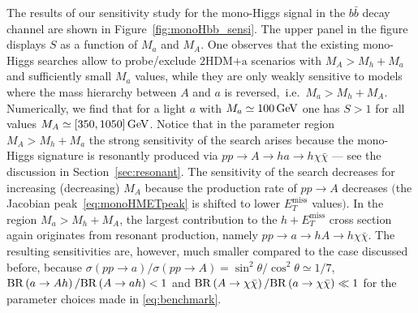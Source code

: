 \documentclass[a4paper, 11pt,notoc]{article}
\newcommand{\MET}{\ensuremath{E_T^\mathrm{miss}}\xspace}
\newcommand{\mA}{\ensuremath{M_{A}}\xspace}
\newcommand{\ma}{\ensuremath{M_{a}}\xspace}
\newcommand{\hdma}{\ensuremath{\textrm{2HDM+a}}\xspace}
\begin{document}
The results of our sensitivity study for the mono-Higgs signal in the $b \bar b$ decay channel are shown in Figure~\ref{fig:monoHbb_sensi}. The upper panel in the figure displays $S$  as a function of $\ma$ and $\mA$. %
One observes that the existing mono-Higgs searches allow to probe/exclude \hdma scenarios with  $\mA > M_h + \ma$  and sufficiently small $\ma$ values, while they are only weakly  sensitive to models where the mass hierarchy between $A$ and $a$ is reversed,~i.e.~$\ma > M_h + \mA$. Numerically, we find that  for  a light $a$ with $\ma \simeq 100 \, {\rm GeV}$ one has $S > 1$ for all values $\mA \simeq [350, 1050] \, {\rm GeV}$. Notice that in the parameter region  $\mA > M_h + \ma$ the strong sensitivity of the search arises because the mono-Higgs signature is resonantly produced via $pp \to A \to ha \to h \chi \bar \chi$ --- see the discussion in Section~\ref{sec:resonant}. The sensitivity of the search decreases for increasing (decreasing) $M_A$ because the production rate of $pp \to A$  decreases $\big($the Jacobian peak~\eqref{eq:monoHMETpeak} is shifted to lower $\MET$ values$\big)$. In the region $\ma > M_h + \mA$, the largest contribution to the $h + \MET$ cross section again originates from resonant production, namely $pp \to a \to hA \to h \chi \bar \chi$.  The resulting sensitivities are, however, much smaller compared to the case discussed before, because  $\sigma \left (p p \to a \right )/\sigma \left (pp \to A \right ) = \sin^2 \theta/\cos^2 \theta \simeq 1/7$, ${\rm BR} \left ( a \to A h \right )/{\rm BR} \left (  A \to a h  \right ) < 1$ and ${\rm BR} \left ( A \to \chi \bar \chi \right )/{\rm BR} \left (  a \to \chi \bar \chi \right ) \ll~\!\!1$ for the parameter choices made in \eqref{eq:benchmark}. 
\end{document}
